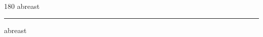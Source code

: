 
\begin{frame}
\begin{center}
\begin{turn}{180}
{\fontsize{2.5cm}{1em}\selectfont abreast}
\end{turn}
\vspace{1em}\par  
\hrule
\vspace{1em}\par  
{\fontsize{2.5cm}{1em}\selectfont abreast}
\end{center}
\end{frame}
